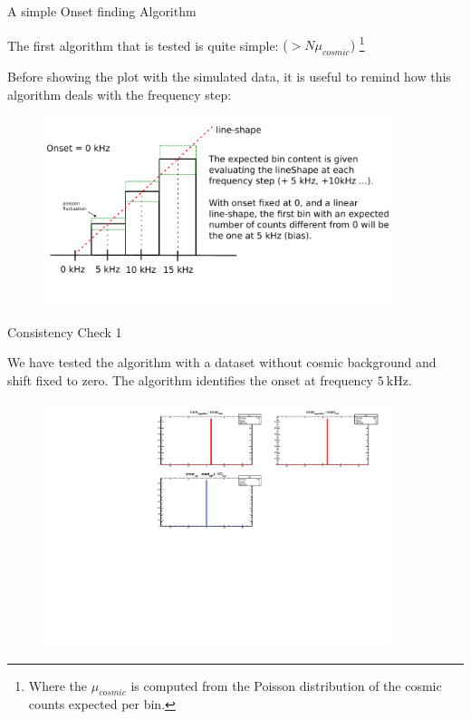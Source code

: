 \documentclass[8pt]{beamer}
\begin{document}
\begin{frame}{A simple Onset finding Algorithm}

The first algorithm that is tested is quite simple: { ($> N\mu_{cosmic}$)} \footnote{Where the $\mu_{cosmic}$ is computed from the Poisson distribution of the cosmic counts expected per bin.}

Before showing the plot with the simulated data, it is useful to remind how this algorithm deals with the frequency step:

\begin{figure}
\includegraphics[width = 0.9\textwidth]{ExplainingAlgorithm1.pdf}
\end{figure}
\end{frame}

\begin{frame}{Consistency Check 1}

We have tested the algorithm with a dataset without cosmic background and shift fixed to zero. The algorithm identifies the onset at frequency $\SI{5}{\kilo \hertz}$.

\begin{figure}
\includegraphics[width = 0.9\textwidth]{../Plot/OnsetResult.pdf}
\end{figure} 
\end{frame}
\end{document}
